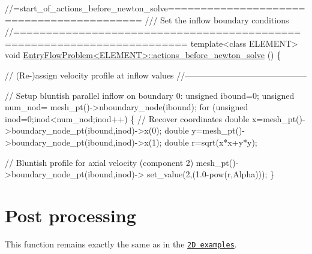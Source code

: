 \begin{DoxyCodeInclude}
\textcolor{comment}{//=start\_of\_actions\_before\_newton\_solve==========================================}
\textcolor{comment}{/// Set the inflow boundary conditions}
\textcolor{comment}{}\textcolor{comment}{//========================================================================}
\textcolor{keyword}{template}<\textcolor{keyword}{class} ELEMENT>
\textcolor{keywordtype}{void} \hyperlink{classEntryFlowProblem_ae4dde95573350d8fdb19463849991130}{EntryFlowProblem<ELEMENT>::actions\_before\_newton\_solve}
      ()
\{

 \textcolor{comment}{// (Re-)assign velocity profile at inflow values}
 \textcolor{comment}{//--------------------------------------------}

 \textcolor{comment}{// Setup bluntish parallel inflow on boundary 0:}
 \textcolor{keywordtype}{unsigned} ibound=0; 
 \textcolor{keywordtype}{unsigned} num\_nod= mesh\_pt()->nboundary\_node(ibound); 
 \textcolor{keywordflow}{for} (\textcolor{keywordtype}{unsigned} inod=0;inod<num\_nod;inod++)
  \{
   \textcolor{comment}{// Recover coordinates}
   \textcolor{keywordtype}{double} x=mesh\_pt()->boundary\_node\_pt(ibound,inod)->x(0);
   \textcolor{keywordtype}{double} y=mesh\_pt()->boundary\_node\_pt(ibound,inod)->x(1);
   \textcolor{keywordtype}{double} r=sqrt(x*x+y*y);  
   
   \textcolor{comment}{// Bluntish profile for axial velocity (component 2)}
   mesh\_pt()->boundary\_node\_pt(ibound,inod)->
    set\_value(2,(1.0-pow(r,Alpha)));
  \}

\end{DoxyCodeInclude}




 

\hypertarget{index_doc}{}\section{Post processing}\label{index_doc}
This function remains exactly the same as in the \href{../../driven_cavity/html/index.html}{\tt 2D examples}.


